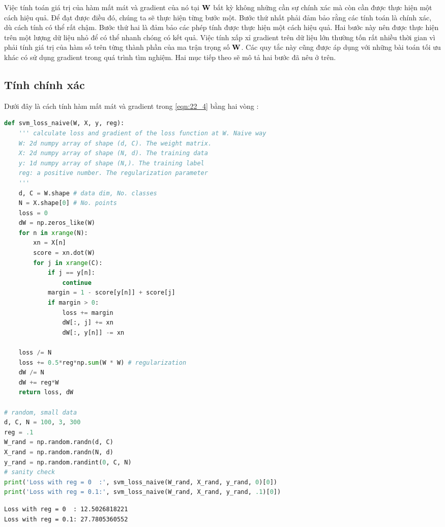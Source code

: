 Việc tính toán giá trị của hàm mất mát và gradient của nó tại $\mathbf{W}$ bất kỳ không
những cần sự chính xác mà còn cần được thực hiện một cách hiệu quả. Để đạt được
điều đó, chúng ta sẽ thực hiện từng bước một. Bước thứ nhất phải đảm bảo rằng các
tính toán là {chính xác}, dù cách tính có thể rất chậm. Bước thứ hai là đảm bảo
các phép tính được thực hiện một cách hiệu quả. Hai bước này nên được thực hiện
trên một lượng dữ liệu nhỏ để có thể nhanh chóng có kết quả. Việc tính xấp xỉ
gradient trên dữ liệu lớn thường tốn rất nhiều thời gian vì phải tính giá trị
của hàm số trên từng thành phần của ma trận trọng số $\mathbf{W}$. Các quy tắc này cũng
được áp dụng với những bài toán tối ưu khác có sử dụng gradient trong quá trình
tìm nghiệm. Hai mục tiếp theo sẽ mô tả hai bước đã nêu ở trên.


\subsection{Tính chính xác}


Dưới đây là cách tính hàm mất mát và gradient trong \eqref{eqn:22_4}
bằng hai vòng :
\begin{lstlisting}[language=Python]
def svm_loss_naive(W, X, y, reg):
    ''' calculate loss and gradient of the loss function at W. Naive way
    W: 2d numpy array of shape (d, C). The weight matrix.
    X: 2d numpy array of shape (N, d). The training data
    y: 1d numpy array of shape (N,). The training label
    reg: a positive number. The regularization parameter
    '''
    d, C = W.shape # data dim, No. classes
    N = X.shape[0] # No. points
    loss = 0
    dW = np.zeros_like(W)
    for n in xrange(N):
        xn = X[n]
        score = xn.dot(W)
        for j in xrange(C):
            if j == y[n]:
                continue
            margin = 1 - score[y[n]] + score[j]
            if margin > 0:
                loss += margin
                dW[:, j] += xn
                dW[:, y[n]] -= xn

    loss /= N
    loss += 0.5*reg*np.sum(W * W) # regularization
    dW /= N
    dW += reg*W
    return loss, dW

# random, small data
d, C, N = 100, 3, 300
reg = .1
W_rand = np.random.randn(d, C)
X_rand = np.random.randn(N, d)
y_rand = np.random.randint(0, C, N)
# sanity check
print('Loss with reg = 0  :', svm_loss_naive(W_rand, X_rand, y_rand, 0)[0])
print('Loss with reg = 0.1:', svm_loss_naive(W_rand, X_rand, y_rand, .1)[0])
\end{lstlisting}
\kq
\begin{lstlisting}
Loss with reg = 0  : 12.5026818221
Loss with reg = 0.1: 27.7805360552
\end{lstlisting}


